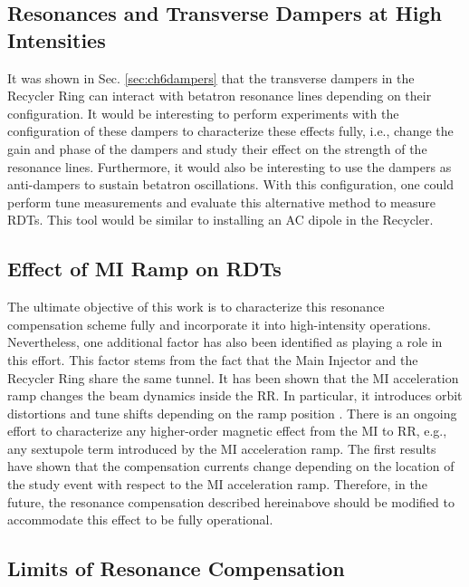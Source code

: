 \subsection{Resonances and Transverse Dampers at High Intensities}

It was shown in Sec. \ref{sec:ch6dampers} that the transverse dampers in the Recycler Ring can interact with betatron resonance lines depending on their configuration. It would be interesting to perform experiments with the configuration of these dampers to characterize these effects fully, i.e., change the gain and phase of the dampers and study their effect on the strength of the resonance lines. Furthermore, it would also be interesting to use the dampers as anti-dampers to sustain betatron oscillations. With this configuration, one could perform tune measurements and evaluate this alternative method to measure RDTs. This tool would be similar to installing an AC dipole in the Recycler.  

\subsection{Effect of MI Ramp on RDTs}

The ultimate objective of this work is to characterize this resonance compensation scheme fully and incorporate it into high-intensity operations. Nevertheless, one additional factor has also been identified as playing a role in this effort. This factor stems from the fact that the Main Injector and the Recycler Ring share the same tunnel. It has been shown that the MI acceleration ramp changes the beam dynamics inside the RR. In particular, it introduces orbit distortions and tune shifts depending on the ramp position \cite{mionrr}. There is an ongoing effort to characterize any higher-order magnetic effect from the MI to RR, e.g., any sextupole term introduced by the MI acceleration ramp. The first results have shown that the compensation currents change depending on the location of the study event with respect to the MI acceleration ramp. Therefore, in the future, the resonance compensation described hereinabove should be modified to accommodate this effect to be fully operational.

\subsection{Limits of Resonance Compensation}

